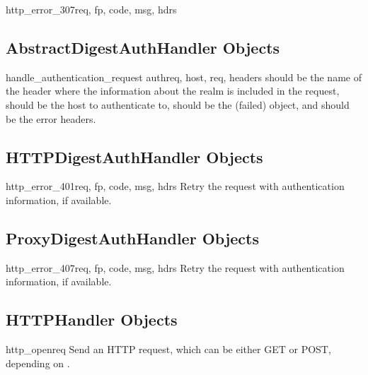 \begin{methoddesc}[HTTPRedirectHandler]{http_error_307}{req,
                                                  fp, code, msg, hdrs}
\subsection{AbstractDigestAuthHandler Objects
            \label{abstract-digest-auth-handler}}

\begin{methoddesc}[AbstractDigestAuthHandler]{handle_authentication_request}
                                            {authreq, host, req, headers}
 should be the name of the header where the information about
the realm is included in the request,  should be the host to
authenticate to,  should be the (failed) 
object, and  should be the error headers.
\end{methoddesc}


\subsection{HTTPDigestAuthHandler Objects
            \label{http-digest-auth-handler}}

\begin{methoddesc}[HTTPDigestAuthHandler]{http_error_401}{req, fp, code, 
                                                        msg, hdrs}
Retry the request with authentication information, if available.
\end{methoddesc}


\subsection{ProxyDigestAuthHandler Objects
            \label{proxy-digest-auth-handler}}

\begin{methoddesc}[ProxyDigestAuthHandler]{http_error_407}{req, fp, code, 
                                                        msg, hdrs}
Retry the request with authentication information, if available.
\end{methoddesc}


\subsection{HTTPHandler Objects \label{http-handler-objects}}

\begin{methoddesc}[HTTPHandler]{http_open}{req}
Send an HTTP request, which can be either GET or POST, depending on
.
\end{methoddesc}



\end{methoddesc}
